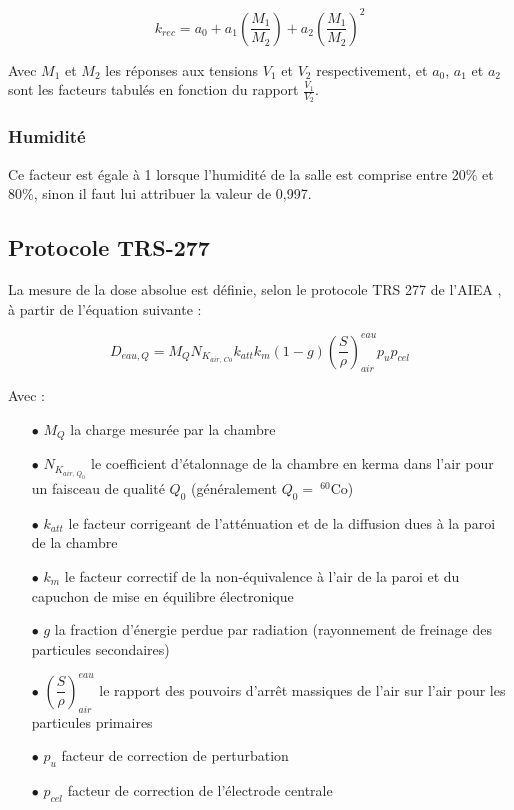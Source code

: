 \documentclass{article}
\begin{document}
\begin{equation}
  k_{rec} = a_0 + a_1 \left(\dfrac{M_1}{M_2}\right) + a_2 \left(\dfrac{M_1}{M_2}\right) ^2
  \label{eq_rec}
\end{equation}

Avec $M_1$ et $M_2$ les réponses aux tensions $V_1$ et $V_2$ respectivement, et $a_0$, $a_1$ et $a_2$ sont les facteurs tabulés en fonction du rapport $\frac{V_1}{V_2}$.

\subsubsection{Humidité}

Ce facteur est égale à 1 lorsque l'humidité de la salle est comprise entre 20\% et 80\%, sinon il faut lui attribuer la valeur de 0,997.

\subsection{Protocole TRS-277}

La mesure de la dose absolue est définie, selon le protocole TRS 277 de l'AIEA \cite{internationaliaea}, à partir de l'équation suivante :

\begin{equation}
  D_{eau, Q} = M_Q N_{K_{air, \, Co}} k_{att} k_{m} (1-g) \left(\dfrac{S}{\rho}\right)^{eau}_{air} p_u p_{cel}
  \label{eq_dose_277}
\end{equation}

Avec :

\begin{itemize}
  \item[$\bullet$] $M_Q$ la charge mesurée par la chambre
  \item[$\bullet$] $N_{K_{air, \, Q_0}}$ le coefficient d'étalonnage de la chambre en kerma dans l'air pour un faisceau de qualité $Q_0$ (généralement $Q_0  =\: ^{60}$Co)
  \item[$\bullet$] $k_{att}$ le facteur corrigeant de l'atténuation et de la diffusion dues à la paroi de la chambre
  \item[$\bullet$] $k_m$ le facteur correctif de la non-équivalence à l'air de la paroi et du capuchon de mise en équilibre électronique
  \item[$\bullet$] $g$ la fraction d'énergie perdue par radiation (rayonnement de freinage des particules secondaires)
  \item[$\bullet$] $\left(\dfrac{S}{\rho}\right) ^{eau}_{air}$ le rapport des pouvoirs d'arrêt massiques de l'air sur l'air pour les particules primaires
  \item[$\bullet$] $p_u$ facteur de correction de perturbation
  \item[$\bullet$] $p_{cel}$ facteur de correction de l'électrode centrale
\end{itemize}
\end{document}
